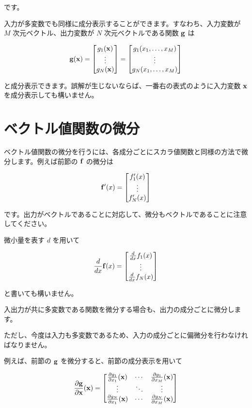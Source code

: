 です。

入力が多変数でも同様に成分表示することができます。すなわち、入力変数が $M$ 次元ベクトル、出力変数が $N$ 次元ベクトルである関数 ${\bf g}$ は


\[
{\bf g}({\bf x}) =
\begin{bmatrix}g_1({\bf x}) \\ \vdots \\ g_N({\bf x})\end{bmatrix} =
\begin{bmatrix}g_1(x_1, \ldots, x_M) \\ \vdots \\ g_N(x_1, \ldots, x_M)\end{bmatrix}
\]


と成分表示できます。誤解が生じないならば、一番右の表式のように入力変数 ${\bf x}$ を成分表示しても構いません。


\section{ベクトル値関数の微分}


ベクトル値関数の微分を行うには、各成分ごとにスカラ値関数と同様の方法で微分します。例えば前節の ${\bf f}$ の微分は


\[
{\bf f}'(x) = \begin{bmatrix} f'_1(x) \\ \vdots \\ f'_N(x) \end{bmatrix}
\]


です。出力がベクトルであることに対応して、微分もベクトルであることに注意してください。

微小量を表す $d$ を用いて


\[
\frac{d}{dx} {\bf f} (x) = \begin{bmatrix} \frac{d}{dx}f_1(x) \\ \vdots \\ \frac{d}{dx}f_N(x) \end{bmatrix}
\]


と書いても構いません。


入出力が共に多変数である関数を微分する場合も、出力の成分ごとに微分します。

ただし、今度は入力も多変数であるため、入力の成分ごとに偏微分を行わなければなりません。

例えば、前節の ${\bf g}$ を微分すると、前節の成分表示を用いて


\[
\frac{\partial {\bf g}}{\partial {\bf x}}({\bf x}) =
\begin{bmatrix}
\frac{\partial g_{1}}{\partial {x_1}}({\bf x}) & \cdots & \frac{\partial g_{1}}{\partial {x_M}}({\bf x}) \\
\vdots & \ddots & \vdots \\
\frac{\partial g_{N}}{\partial {x_1}}({\bf x}) & \cdots & \frac{\partial g_{N}}{\partial {x_M}}({\bf x})
\end{bmatrix}
\]


